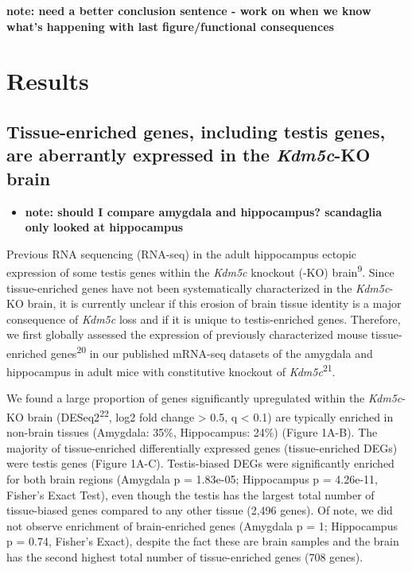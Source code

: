 \documentclass[
]{article}
\providecommand{\tightlist}{%
  \setlength{\itemsep}{0pt}\setlength{\parskip}{0pt}}
\begin{document}
\textbf{note: need a better conclusion sentence - work on when we know
what's happening with last figure/functional consequences}

\hypertarget{results}{%
\section{Results}\label{results}}

\hypertarget{tissue-enriched-genes-including-testis-genes-are-aberrantly-expressed-in-the-kdm5c-ko-brain}{%
\subsection{\texorpdfstring{Tissue-enriched genes, including testis
genes, are aberrantly expressed in the \emph{Kdm5c}-KO
brain}{Tissue-enriched genes, including testis genes, are aberrantly expressed in the Kdm5c-KO brain}}\label{tissue-enriched-genes-including-testis-genes-are-aberrantly-expressed-in-the-kdm5c-ko-brain}}

\begin{itemize}
\tightlist
\item
  \textbf{note: should I compare amygdala and hippocampus? scandaglia
  only looked at hippocampus}
\end{itemize}

Previous RNA sequencing (RNA-seq) in the adult hippocampus ectopic
expression of some testis genes within the \emph{Kdm5c} knockout (-KO)
brain\textsuperscript{9}. Since tissue-enriched genes have not been
systematically characterized in the \emph{Kdm5c}-KO brain, it is
currently unclear if this erosion of brain tissue identity is a major
consequence of \emph{Kdm5c} loss and if it is unique to testis-enriched
genes. Therefore, we first globally assessed the expression of
previously characterized mouse tissue-enriched genes\textsuperscript{20}
in our published mRNA-seq datasets of the amygdala and hippocampus in
adult mice with constitutive knockout of
\emph{Kdm5c}\textsuperscript{21}.

We found a large proportion of genes significantly upregulated within
the \emph{Kdm5c}-KO brain (DESeq2\textsuperscript{22}, log2 fold change
\textgreater{} 0.5, q \textless{} 0.1) are typically enriched in
non-brain tissues (Amygdala: 35\%, Hippocampus: 24\%) (Figure 1A-B). The
majority of tissue-enriched differentially expressed genes
(tissue-enriched DEGs) were testis genes (Figure 1A-C). Testis-biased
DEGs were significantly enriched for both brain regions (Amygdala p =
1.83e-05; Hippocampus p = 4.26e-11, Fisher's Exact Test), even though
the testis has the largest total number of tissue-biased genes compared
to any other tissue (2,496 genes). Of note, we did not observe
enrichment of brain-enriched genes (Amygdala p = 1; Hippocampus p =
0.74, Fisher's Exact), despite the fact these are brain samples and the
brain has the second highest total number of tissue-enriched genes (708
genes).
\end{document}
